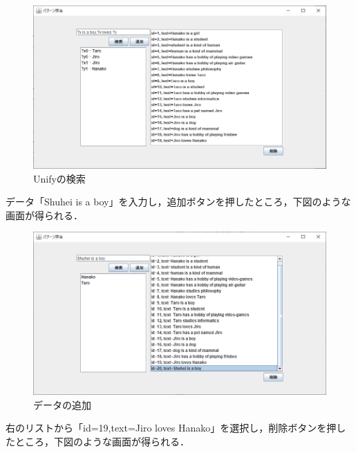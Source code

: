 \documentclass[12pt]{jarticle}
\begin{document}
\begin{figure}[!hbt]
  	\begin{center}
  		\includegraphics[scale=0.60]{images/scs2-3-6.png}
	\end{center}
  	\caption{Unifyの検索}
\end{figure}
\clearpage

データ「Shuhei is a boy」を入力し，追加ボタンを押したところ，下図のような画面が得られる．

\begin{figure}[!hbt]
  	\begin{center}
  		\includegraphics[scale=0.60]{images/scs2-3-3.png}
	\end{center}
  	\caption{データの追加}
\end{figure}
\clearpage

右のリストから「id=19,text=Jiro loves Hanako」を選択し，削除ボタンを押したところ，下図のような画面が得られる．
\end{document}
